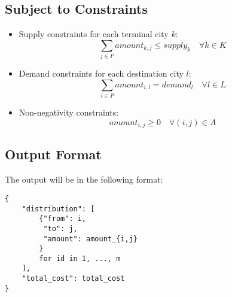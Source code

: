 \documentclass{article}
\begin{document}
\subsection*{Subject to Constraints}
\begin{itemize}
    \item Supply constraints for each terminal city \( k \):
    \[
    \sum_{j \in P} amount_{k,j} \leq supply_k \quad \forall k \in K
    \]

    \item Demand constraints for each destination city \( l \):
    \[
    \sum_{i \in P} amount_{i,l} = demand_l \quad \forall l \in L
    \]

    \item Non-negativity constraints:
    \[
    amount_{i,j} \geq 0 \quad \forall (i,j) \in A
    \]
\end{itemize}

\subsection*{Output Format}
The output will be in the following format:
\begin{verbatim}
{
    "distribution": [
        {"from": i,
         "to": j,
         "amount": amount_{i,j}
        }
        for id in 1, ..., m
    ],
    "total_cost": total_cost
}
\end{verbatim}
\end{document}
